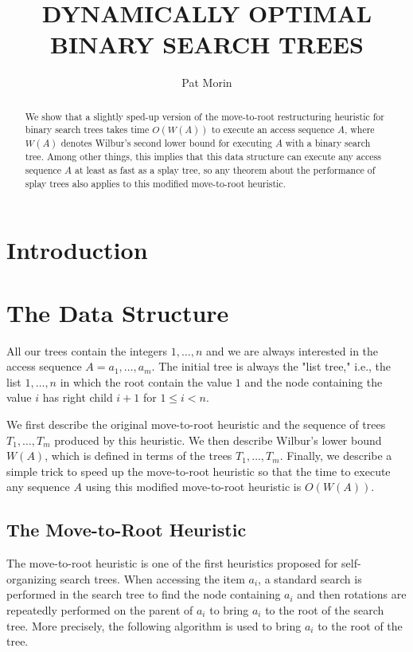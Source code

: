 \documentclass[charterfonts,lotsofwhite]{patmorin}
\title{\MakeUppercase{Dynamically Optimal Binary Search Trees}}
\author{Pat Morin}
\date{}
\begin{document}
\maketitle

\begin{abstract}
We show that a slightly sped-up version of the move-to-root
restructuring heuristic for binary search trees takes time $O(W(A))$ to
execute an access sequence $A$, where $W(A)$ denotes Wilbur's second lower
bound for executing $A$ with a binary search tree.  Among other things,
this implies that this data structure can execute any access sequence
$A$ at least as fast as a splay tree, so any theorem about the
performance of splay trees also applies to this modified move-to-root
heuristic.
\end{abstract}

\section{Introduction}


\section{The Data Structure}

All our trees contain the integers $1,\ldots,n$ and we are always
interested in the access sequence $A=a_1,\ldots,a_m$.  The initial
tree is always the "list tree," i.e., the list $1,\ldots,n$ in which
the root contain the value $1$ and the node containing the value $i$
has right child $i+1$ for $1\le i< n$.  

We first describe the original move-to-root heuristic and the sequence
of trees $T_1,\ldots,T_m$ produced by this heuristic.  We then
describe Wilbur's lower bound $W(A)$, which is defined in terms of the
trees $T_1,\ldots,T_m$.  Finally, we describe a simple trick to speed
up the move-to-root heuristic so that the time to execute any sequence
$A$ using this modified move-to-root heuristic is $O(W(A))$.

\subsection{The Move-to-Root Heuristic}

The move-to-root heuristic is one of the first heuristics proposed for
self-organizing search trees. When accessing the item $a_i$, a
standard search is performed in the search tree to find the node
containing $a_i$ and then rotations are repeatedly performed on the
parent of $a_i$ to bring $a_i$ to the root of the search tree.  More
precisely, the following algorithm is used to bring $a_i$ to the root
of the tree.
\end{document}
